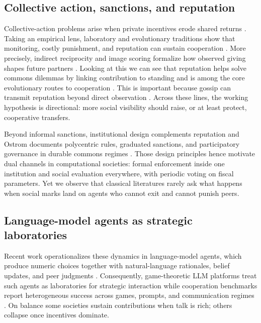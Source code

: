 \subsection{Collective action, sanctions, and reputation}

Collective-action problems arise when private incentives erode shared returns .
Taking an empirical lens, laboratory and evolutionary traditions show that monitoring, costly punishment, and reputation can sustain cooperation .
More precisely, indirect reciprocity and image scoring formalize how observed giving shapes future partners .
Looking at this we can see that reputation helps solve commons dilemmas by linking contribution to standing and is among the core evolutionary routes to cooperation .
This is important because gossip can transmit reputation beyond direct observation .
Across these lines, the working hypothesis is directional: more social visibility should raise, or at least protect, cooperative transfers.

Beyond informal sanctions, institutional design complements reputation and Ostrom documents polycentric rules, graduated sanctions, and participatory governance in durable commons regimes .
Those design principles hence motivate dual channels in computational societies: formal enforcement inside one institution and social evaluation everywhere, with periodic voting on fiscal parameters.
Yet we observe that classical literatures rarely ask what happens when social marks land on agents who cannot exit and cannot punish peers.

\subsection{Language-model agents as strategic laboratories}

Recent work operationalizes these dynamics in language-model agents, which produce numeric choices together with natural-language rationales, belief updates, and peer judgments .
Consequently, game-theoretic LLM platforms treat such agents as laboratories for strategic interaction while cooperation benchmarks report heterogeneous success across games, prompts, and communication regimes .
On balance some societies sustain contributions when talk is rich; others collapse once incentives dominate.

